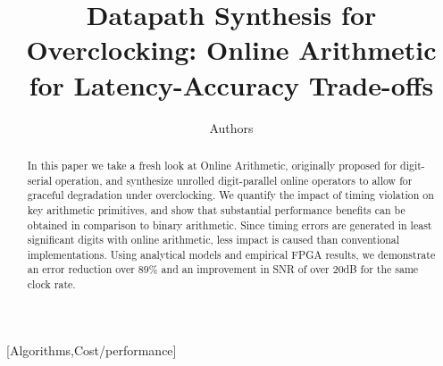 \documentclass{acm_proc_article-sp}
\begin{document}
\title{Datapath Synthesis for Overclocking: Online Arithmetic for Latency-Accuracy Trade-offs}


%
\author{
\alignauthor
Authors
}

\maketitle

\begin{abstract}
In this paper we take a fresh look at Online Arithmetic, originally proposed for digit-serial operation, and synthesize unrolled digit-parallel online operators to allow for graceful degradation under overclocking. We quantify the impact of timing violation on key arithmetic primitives, and show that substantial performance benefits can be obtained in comparison to binary arithmetic. Since timing errors are generated in least significant digits with online arithmetic, less impact is caused than conventional implementations. Using analytical models and empirical FPGA results, we demonstrate an error reduction over $89\%$ and an improvement in SNR of over 20dB for the same clock rate.
\end{abstract}
%
[Algorithms,Cost/performance]
\end{document}
